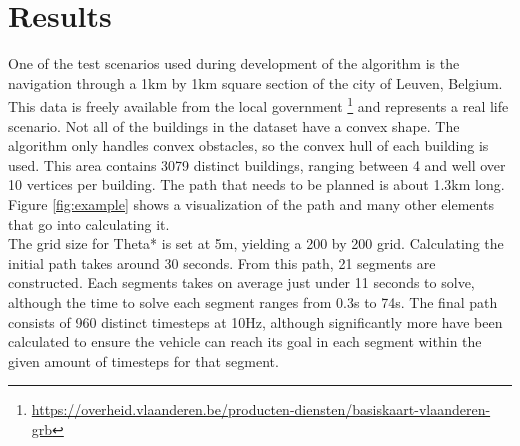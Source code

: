 \documentclass[12pt]{article}
\begin{document}
\section{Results}
One of the test scenarios used during development of the algorithm is the navigation through a 1km by 1km square section of the city of Leuven, Belgium. This data is freely available from the local government \footnote{\url{https://overheid.vlaanderen.be/producten-diensten/basiskaart-vlaanderen-grb}} and represents a real life scenario. Not all of the buildings in the dataset have a convex shape. The algorithm only handles convex obstacles, so the convex hull of each building is used. This area contains 3079 distinct buildings, ranging between 4 and well over 10 vertices per building. The path that needs to be planned is about 1.3km long. Figure \ref{fig:example} shows a visualization of the path and many other elements that go into calculating it.
\\
The grid size for Theta* is set at 5m, yielding a 200 by 200 grid. Calculating the initial path takes around 30 seconds. From this path, 21 segments are constructed. Each segments takes on average just under 11 seconds to solve, although the time to solve each segment ranges from 0.3s to 74s. The final path consists of 960 distinct timesteps at 10Hz, although significantly more have been calculated to ensure the vehicle can reach its goal in each segment within the given amount of timesteps for that segment.
\end{document}
